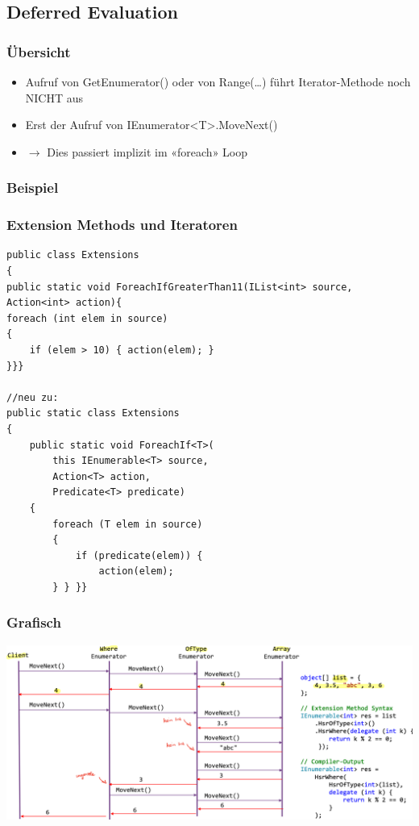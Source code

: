 \subsection{Deferred Evaluation}
\subsubsection{Übersicht}
\begin{itemize}
    \item Aufruf von GetEnumerator() oder von Range(…) führt Iterator-Methode noch NICHT aus
    \item Erst der Aufruf von IEnumerator<T>.MoveNext()
    \item $\rightarrow$ Dies passiert implizit im «foreach» Loop
\end{itemize}
\subsubsection{Beispiel}

\subsubsection{Extension Methods und Iteratoren}
\begin{lstlisting}
public class Extensions
{
public static void ForeachIfGreaterThan11(IList<int> source, Action<int> action){
foreach (int elem in source)
{
    if (elem > 10) { action(elem); }
}}}

//neu zu:
public static class Extensions
{
    public static void ForeachIf<T>(
        this IEnumerable<T> source,
        Action<T> action,
        Predicate<T> predicate)
    {
        foreach (T elem in source)
        {
            if (predicate(elem)) {
                action(elem);
        } } }}
\end{lstlisting}

\subsubsection{Grafisch}
\begin{center}
    \includegraphics[scale=.24]{graphic/iterator/Deferred Evaluation.png}
\end{center}


\newpage


